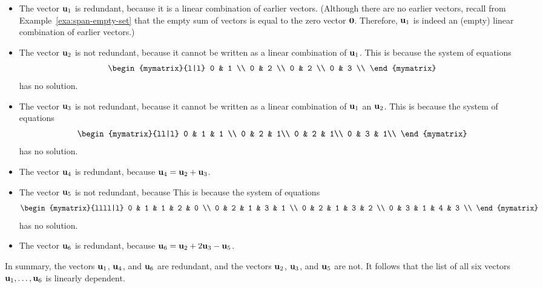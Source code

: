 \begin{solution}
  \begin{itemize}
  \item The vector $\mbox{\bf u}_1$ is redundant, because it is a linear
    combination of earlier vectors. (Although there are no earlier
    vectors, recall from Example~\ref{exa:span-empty-set} that the empty
    sum of vectors is equal to the zero vector $\mbox{\bf 0}$. Therefore,
    $\mbox{\bf u}_1$ is indeed an (empty) linear combination of earlier
    vectors.)
  \item The vector $\mbox{\bf u}_2$ is not redundant, because it cannot be
    written as a linear combination of $\mbox{\bf u}_1$. This is because
    the system of equations
    \begin{equation*}
      \begin{mymatrix}{l|l}
        0 & 1 \\
        0 & 2 \\
        0 & 2 \\
        0 & 3 \\
      \end{mymatrix}
    \end{equation*}
    has no solution.
  \item The vector $\mbox{\bf u}_3$ is not redundant, because it cannot be
    written as a linear combination of $\mbox{\bf u}_1$ an $\mbox{\bf u}_2$.
    This is because the system of equations
    \begin{equation*}
      \begin{mymatrix}{ll|l}
        0 & 1 & 1 \\
        0 & 2 & 1\\
        0 & 2 & 1\\
        0 & 3 & 1\\
      \end{mymatrix}
    \end{equation*}
    has no solution.
  \item The vector $\mbox{\bf u}_4$ is redundant, because $\mbox{\bf u}_4 =
    \mbox{\bf u}_2 + \mbox{\bf u}_3$.
  \item The vector $\mbox{\bf u}_5$ is not redundant, because 
    This is because the system of equations
    \begin{equation*}
      \begin{mymatrix}{llll|l}
        0 & 1 & 1 & 2 & 0 \\
        0 & 2 & 1 & 3 & 1 \\
        0 & 2 & 1 & 3 & 2 \\
        0 & 3 & 1 & 4 & 3 \\
      \end{mymatrix}
    \end{equation*}
    has no solution.
  \item The vector $\mbox{\bf u}_6$ is redundant, because $\mbox{\bf u}_6 =
    \mbox{\bf u}_2 + 2\mbox{\bf u}_3-\mbox{\bf u}_5$.
  \end{itemize}
  In summary, the vectors $\mbox{\bf u}_1$, $\mbox{\bf u}_4$, and $\mbox{\bf u}_6$
  are redundant, and the vectors $\mbox{\bf u}_2$, $\mbox{\bf u}_3$, and
  $\mbox{\bf u}_5$ are not. It follows that the list of all six vectors
  $\mbox{\bf u}_1,\ldots,\mbox{\bf u}_6$ is linearly dependent.
\end{solution}

